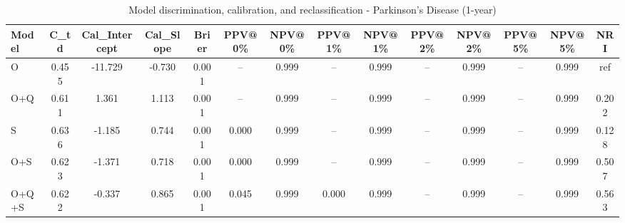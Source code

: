 \begin{table}[htbp]
\centering
\small
\caption{Model discrimination, calibration, and reclassification - Parkinson's Disease (1-year)}
\label{tab:perf_pd_1y}
\begin{tabular}{lccccccccccccc}
\toprule
Model & C\_td & Cal\_Intercept & Cal\_Slope & Brier & PPV@0\% & NPV@0\% & PPV@1\% & NPV@1\% & PPV@2\% & NPV@2\% & PPV@5\% & NPV@5\% & NRI \\
\midrule
O & 0.455 & -11.729 & -0.730 & 0.001 & -- & 0.999 & -- & 0.999 & -- & 0.999 & -- & 0.999 & ref \\
O+Q & 0.611 & 1.361 & 1.113 & 0.001 & -- & 0.999 & -- & 0.999 & -- & 0.999 & -- & 0.999 & 0.202 \\
S & 0.636 & -1.185 & 0.744 & 0.001 & 0.000 & 0.999 & -- & 0.999 & -- & 0.999 & -- & 0.999 & 0.128 \\
O+S & 0.623 & -1.371 & 0.718 & 0.001 & 0.000 & 0.999 & -- & 0.999 & -- & 0.999 & -- & 0.999 & 0.507 \\
O+Q+S & 0.622 & -0.337 & 0.865 & 0.001 & 0.045 & 0.999 & 0.000 & 0.999 & -- & 0.999 & -- & 0.999 & 0.563 \\
\bottomrule
\end{tabular}
\end{table}